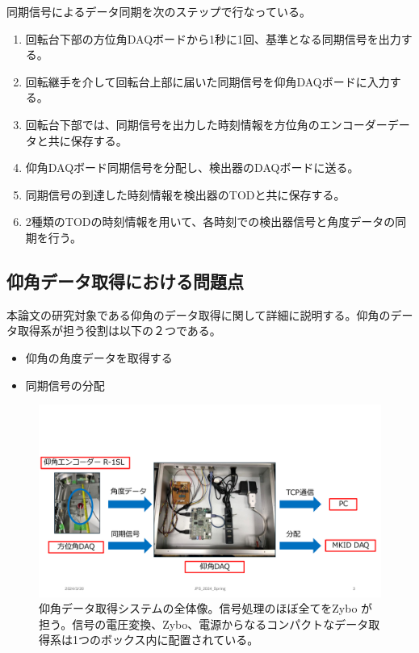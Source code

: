 同期信号によるデータ同期を次のステップで行なっている。
\begin{enumerate}
  \item 回転台下部の方位角DAQボードから1秒に1回、基準となる同期信号を出力する。
  \item 回転継手を介して回転台上部に届いた同期信号を仰角DAQボードに入力する。
  \item 回転台下部では、同期信号を出力した時刻情報を方位角のエンコーダーデータと共に保存する。
  \item 仰角DAQボード同期信号を分配し、検出器のDAQボードに送る。
  \item 同期信号の到達した時刻情報を検出器のTODと共に保存する。
  \item 2種類のTODの時刻情報を用いて、各時刻での検出器信号と角度データの同期を行う。
\end{enumerate}

\subsection{仰角データ取得における問題点}
本論文の研究対象である仰角のデータ取得に関して詳細に説明する。仰角のデータ取得系が担う役割は以下の２つである。
\begin{itemize}
  \item 仰角の角度データを取得する
  \item 同期信号の分配
\end{itemize}

\begin{figure}[htbp]
  \centering
  \includegraphics[width=1.0\columnwidth]{4_elDAQ/figs/el_daq_box.pdf}
  \caption{仰角データ取得システムの全体像。信号処理のほぼ全てをZybo \cite{Zybo}が担う。信号の電圧変換、Zybo、電源からなるコンパクトなデータ取得系は1つのボックス内に配置されている。}
  \label{GB_daq_box}
\end{figure}


